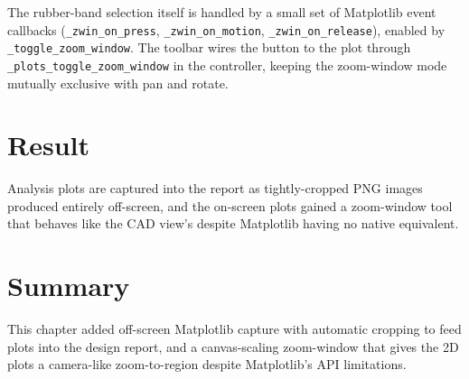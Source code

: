 The rubber-band selection itself is handled by a small set of Matplotlib event callbacks
(\texttt{\_zwin\_on\_press}, \texttt{\_zwin\_on\_motion}, \texttt{\_zwin\_on\_release}), enabled
by \texttt{\_toggle\_zoom\_window}. The toolbar wires the button to the plot through
\texttt{\_plots\_toggle\_zoom\_window} in the controller, keeping the zoom-window mode mutually
exclusive with pan and rotate.

\section{Result}
Analysis plots are captured into the report as tightly-cropped PNG images produced entirely
off-screen, and the on-screen plots gained a zoom-window tool that behaves like the CAD view's
despite Matplotlib having no native equivalent.



\section{Summary}
This chapter added off-screen Matplotlib capture with automatic cropping to feed plots into the
design report, and a canvas-scaling zoom-window that gives the 2D plots a camera-like
zoom-to-region despite Matplotlib's API limitations.
